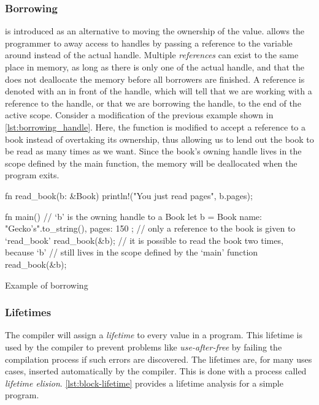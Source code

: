 \subsubsection{Borrowing}
\label{ssec:borrowing}

 is introduced as an alternative to moving the ownership of the value.
{\rust} allows the programmer to  away access to handles by passing a reference to the variable around instead of the actual handle.
Multiple \emph{references} can exist to the same place in memory, as long as there is only one  of the actual handle, and that the  does not deallocate the memory before all borrowers are finished.
A reference is denoted with an \code{\&} in front of the handle, which will tell {\rust} that we are working with a reference to the handle, or that we are borrowing the handle, to the end of the active scope.
Consider a modification of the previous example shown in \autoref{lst:borrowing_handle}.
Here, the  function is modified to accept a reference to a book instead of overtaking its ownership, thus allowing us to lend out the book to be read as many times as we want.
Since the book's owning handle lives in the scope defined by the main function, the memory will be deallocated when the program exits.

\begin{listing}[tb]
\begin{rustcode}
fn read_book(b: &Book) {
  println!("You just read {} pages", b.pages);
}

fn main() {
  // `b' is the owning handle to a Book
  let b = Book { name: "Gecko's".to_string(), pages: 150 };
  // only a reference to the book is given to `read_book'
  read_book(&b);
  // it is possible to read the book two times, because `b'
  // still lives in the scope defined by the `main' function
  read_book(&b);
 }
\end{rustcode}
\caption{Example of borrowing}
\label{lst:borrowing_handle}
\end{listing}

\subsubsection{Lifetimes}
\label{ssec:lifetimes}

The {\rust} compiler will assign a \emph{lifetime} to every value in a program.
This lifetime is used by the compiler to prevent problems like \emph{use-after-free} by failing the compilation process if such errors are discovered.
The lifetimes are, for many uses cases, inserted automatically by the compiler.
This is done with a process called \emph{lifetime elision}.
\autoref{lst:block-lifetime} provides a lifetime analysis for a simple program.


